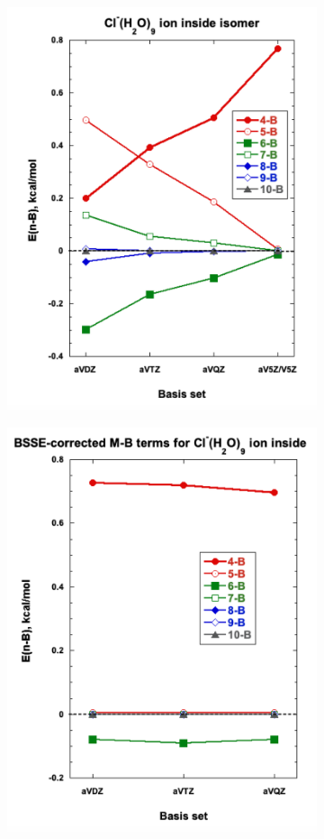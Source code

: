 \documentclass[11pt, proquest]{uwthesis}[2020/02/24]
\begin{document}
\begin{figure}
  \medskip

  \begin{subfigure}[t]{.5\textwidth}
    \centering
    \includegraphics[width=.9\linewidth]{Figures/Chapter_3/figure_7_bl.pdf}
  \end{subfigure}
  \hfill
  \begin{subfigure}[t]{.5\textwidth}
    \centering
    \includegraphics[width=.9\linewidth]{Figures/Chapter_3/figure_7_br.pdf}

\end{subfigure}
\end{figure}
\end{document}
